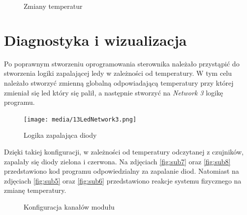 \documentclass{article}
\begin{document}
\vspace{2em}

\begin{figure}[!ht]
    \centering
        \hfill
    \caption{Zmiany temperatur}
    \label{fig:main2}
\end{figure}

\newpage
\section{Diagnostyka i wizualizacja}
Po poprawnym stworzeniu oprogramowania sterownika należało przystąpić do stworzenia logiki zapalającej ledy w zależności od temperatury. W tym celu należało stworzyć zmienną globalną odpowiadającą temperatury przy której zmieniał się led który się palił, a następnie stworzyć na \textit{Network 3} logikę programu.

\begin{figure}[H]
    \centering
    \texttt{[image: media/13LedNetwork3.png]}
    \caption{Logika zapalająca diody}
    \label{fig:ledy}    
\end{figure}


\newpage
Dzięki takiej konfiguracji, w zależności od temperatury odczytanej z czujników, zapalały się diody zielona i czerwona. Na zdjęciach \ref{fig:sub7} oraz \ref{fig:sub8} przedstawiono kod programu odpowiedzialny za zapalanie diod. Natomiast na zdjęciach \ref{fig:sub5} oraz \ref{fig:sub6} przedstawiono reakcje systemu fizycznego na zmianę temperatury.
\begin{figure}[!ht]
    \centering
   
        \hfill
    \caption{Konfiguracja kanałów modułu}
    \label{fig:main3}
\end{figure}
\end{document}
